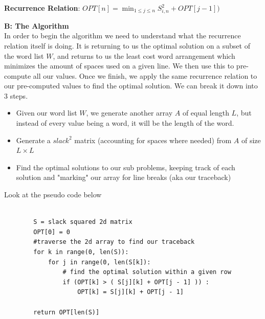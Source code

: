 \documentclass[11pt]{article}
\begin{document}
\begin{solution}
		\hfil
		
		
		\begin{center}
			\textbf{Recurrence Relation}: $OPT[n] = \displaystyle\min_{1\leq j \leq n} S^2_{i,n}+ OPT[j - 1])$
		\end{center}
		
		
		
	
	\hfil
	
	\textbf{B: The Algorithm} \\
	
	In order to begin the algorithm we need to understand what the recurrence relation itself is doing. It is returning to us the optimal solution on a subset of the word list $W$, and returns to us the least cost word arrangement which minimizes the amount of spaces used on a given line. We then use this to pre-compute all our values. Once we finish, we apply the same recurrence relation to our pre-computed values to find the optimal solution. We can break it down into 3 steps.  
	
	\begin{itemize}
		\item Given our word list $W$, we generate another array $A$ of equal length $L$, but instead of every value being a word, it will be the length of the word.
  		\item Generate a $slack^2$ matrix (accounting for spaces where needed) from $A$ of size $L \times L$ 
  		\item Find the optimal solutions to our sub problems, keeping track of each solution and "marking" our array for line breaks (aka our traceback)
	\end{itemize}
	
	\hfil
	
		Look at the pseudo code below
		
	\hfil	
	
	
	
    
    
	\begin{lstlisting}
	
		S = slack squared 2d matrix
		OPT[0] = 0
		#traverse the 2d array to find our traceback
		for k in range(0, len(S)):
			for j in range(0, len(S[k]):
				# find the optimal solution within a given row
				if (OPT[k] > ( S[j][k] + OPT[j - 1] )) :
					OPT[k] = S[j][k] + OPT[j - 1]
		
		return OPT[len(S)]
		
		 
	\end{lstlisting}
	
	\hfil
	

\end{solution}
\end{document}
